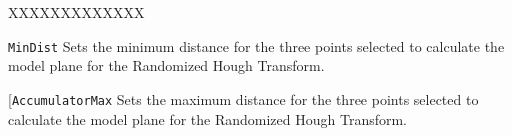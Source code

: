 \documentclass{InsightArticle}
\newcommand{\X}{XXXXXXXXXXXXX}
\begin{document}
\begin{liste}{\X}
\item[\texttt{MinDist}] Sets the minimum distance for the three points
selected to calculate the model plane for the Randomized Hough Transform.
\item[\texttt{AccumulatorMax} Sets the maximum distance for the three points
selected to calculate the model plane for the Randomized Hough Transform.

\end{liste}



\end{document}
